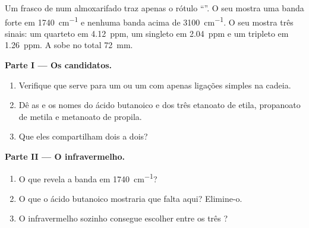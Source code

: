 \begin{problem}
\label{pb:g12:proton-nmr:1}
Um frasco de  num almoxarifado traz apenas o rótulo
``''. O seu  mostra uma banda forte em
\qty{1740}{cm^{-1}} e nenhuma banda acima de \qty{3100}{cm^{-1}}. O seu
 mostra três sinais: um quarteto em \qty{4.12}{ppm}, um
singleto em \qty{2.04}{ppm} e um tripleto em \qty{1.26}{ppm}. A  sobe no total \qty{72}{mm}.

\medskip
\noindent\textbf{Parte I --- Os candidatos.}
\begin{enumerate}
  \item Verifique que  serve para um  ou um  com apenas ligações simples na cadeia.
  \item Dê as  e os nomes do ácido
        butanoico e dos três  etanoato de etila, propanoato de
        metila e metanoato de propila.
  \item Que  eles compartilham dois a dois?
\end{enumerate}

\medskip
\noindent\textbf{Parte II --- O infravermelho.}
\begin{enumerate}[resume]
  \item O que revela a banda em \qty{1740}{cm^{-1}}?
  \item O que o ácido butanoico mostraria que falta aqui? Elimine-o.
  \item O infravermelho sozinho consegue escolher entre os três ?
\end{enumerate}


\end{problem}
